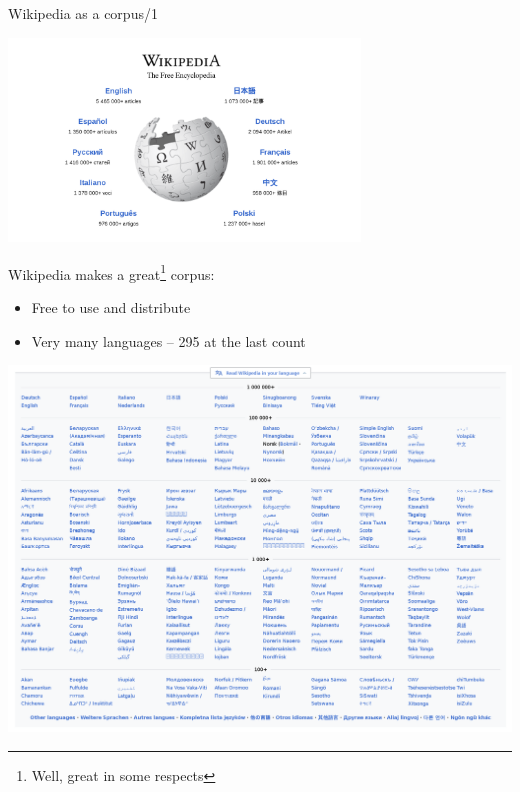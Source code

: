 \documentclass[10pt, compress]{beamer}
\begin{document}
\begin{frame}{Wikipedia as a corpus/1}

\begin{center}
\includegraphics[width=0.70\textwidth]{graphics/wikipedia-front.png}
\end{center}

Wikipedia makes a great\footnote{Well, great in some respects} corpus:

\begin{itemize}
   \item Free to use and distribute
   \item Very many languages -- 295 at the last count
\end{itemize}

\end{frame}

\begin{frame}
\begin{center}
\includegraphics[width=\textwidth]{graphics/wikipedia-all.png}
\end{center}
\end{frame}
\end{document}
